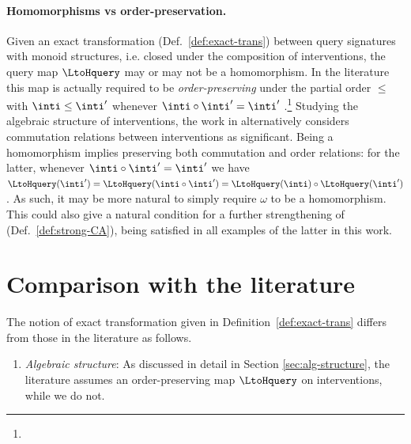 \documentclass{article}
\begin{document}
{\paragraph{Homomorphisms vs order-preservation.}
Given an exact transformation (Def.~\ref{def:exact-trans}) between query signatures with monoid structures, i.e. closed under the composition of interventions, the query map $\LtoHquery$ may or may not be a homomorphism.  
In the literature this map is 
actually required to be \emph{order-preserving} under the partial order $\leq$ with $\inti \leq \inti'$ whenever $\inti \circ \inti' = \inti'$ \cite{rubenstein2017causal, BeckersEtAl_2019_AbstractingCausalModles, geiger2023causal}.\footnote{}
Studying the algebraic structure of interventions, the work in  \cite{geiger2023causal} alternatively considers commutation relations between interventions as significant. 
Being a homomorphism implies preserving both commutation and order relations: for the latter,  
whenever $\inti \circ \inti' = \inti'$  we have 
$\LtoHquery(\inti') = \LtoHquery(\inti \circ \inti') = \LtoHquery(\inti) \circ \LtoHquery(\inti')$. 
As such, it may be more natural to simply require $\omega$ to be a homomorphism. 
This could also give a natural condition for a further strengthening of 
\emph{\strongCA} (Def.~\ref{def:strong-CA}), being satisfied in all examples of the latter in this work.

 
\section{Comparison with the literature} \label{sec:lit-comparison}
 
\begin{remark} \label{rem:ET-notions} 
	The notion of exact transformation given in Definition~\ref{def:exact-trans} differs from those in the literature as follows. 
	\begin{enumerate}
				
		\item \emph{Algebraic structure}: As discussed in detail in Section \ref{sec:alg-structure}, the literature assumes an order-preserving map  $\LtoHquery$ on interventions, while we do not. 


\end{enumerate}
\end{remark}}
\end{document}
